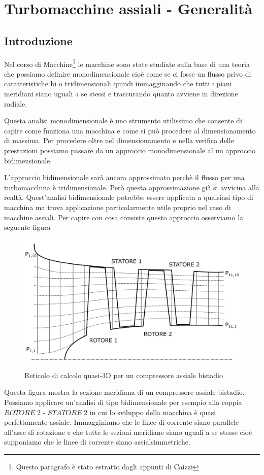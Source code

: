 \chapter{Turbomacchine assiali - Generalità}

\section{Introduzione}
Nel corso di Macchine\footnote{Questo paragrafo è stato estratto dagli appunti di Caizzi} le macchine sono state studiate sulla base di una teoria
che possiamo definire monodimensionale cioè come se ci fosse un flusso privo
di caratteristiche bi o tridimensionali quindi immagginando che tutti i piani
meridiani siano uguali a se stessi e trascurando quanto avviene in direzione
radiale.

Questa analisi monodimensionale è uno strumento utilissimo che consente di
capire come funziona una macchina e come si può procedere al
dimensionamento di massima. Per procedere oltre nel dimensionamento e
nella verifica delle prestazioni possiamo passare da un approccio
monodimensionale al un approccio bidimensionale.

L’approccio bidimensionale sarà ancora approssimato perchè il flusso per una
turbomacchina è tridimensionale. Però questa approssimazione già si avvicina
alla realtà. Quest’analisi bidimensionale potrebbe essere applicata a qualsiasi
tipo di macchina ma trova applicazione particolarmente utile proprio nel caso di
macchine assiali. Per capire con cosa consiste questo approccio osserviamo la
seguente figura
\begin{figure}
\centering
  \includegraphics[width=.8\textwidth]{fig/ReticoloComp.pdf}
\caption{Reticolo di calcolo quasi-3D per un compressore assiale bistadio}
\label{fig:ReticoloComp}
\end{figure}
Questa figura mostra la sezione meridiana di un compressore assiale bistadio.
Possiamo applicare un’analisi di tipo bidimensionale per esempio alla coppia
$ROTORE\;2$ - $STATORE\;2$ in cui lo sviluppo della macchina è quasi perfettamente assiale. Immagginiamo che le linee di corrente siano parallele all’asse di
rotazione e che tutte le sezioni meridiane siano uguali a se stesse cioè
supponiamo che le linee di corrente siano assialsimmetriche.

